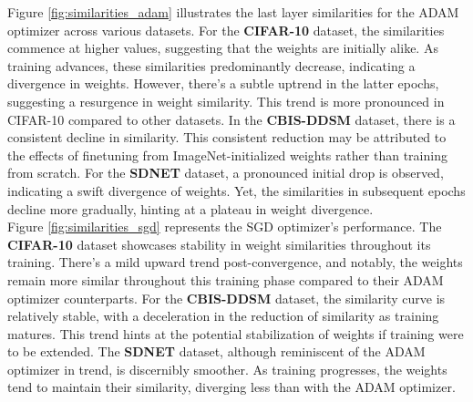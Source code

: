 Figure \ref{fig:similarities_adam} illustrates the last layer similarities for the ADAM optimizer across various datasets. For the \textbf{CIFAR-10} dataset, the similarities commence at higher values, suggesting that the weights are initially alike. As training advances, these similarities predominantly decrease, indicating a divergence in weights. However, there's a subtle uptrend in the latter epochs, suggesting a resurgence in weight similarity. This trend is more pronounced in CIFAR-10 compared to other datasets. In the \textbf{CBIS-DDSM} dataset, there is a consistent decline in similarity. This consistent reduction may be attributed to the effects of finetuning from ImageNet-initialized weights rather than training from scratch. For the \textbf{SDNET} dataset, a pronounced initial drop is observed, indicating a swift divergence of weights. Yet, the similarities in subsequent epochs decline more gradually, hinting at a plateau in weight divergence. \\

Figure \ref{fig:similarities_sgd} represents the SGD optimizer's performance. The \textbf{CIFAR-10} dataset showcases stability in weight similarities throughout its training. There's a mild upward trend post-convergence, and notably, the weights remain more similar throughout this training phase compared to their ADAM optimizer counterparts. For the \textbf{CBIS-DDSM} dataset, the similarity curve is relatively stable, with a deceleration in the reduction of similarity as training matures. This trend hints at the potential stabilization of weights if training were to be extended. The \textbf{SDNET} dataset, although reminiscent of the ADAM optimizer in trend, is discernibly smoother. As training progresses, the weights tend to maintain their similarity, diverging less than with the ADAM optimizer.\\


\clearpage

